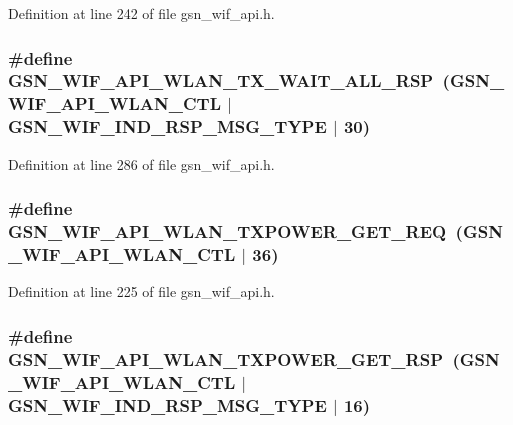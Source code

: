 Definition at line 242 of file gsn\_\-wif\_\-api.h.

\hypertarget{a00606_ae4403ddde31a8f4999ec840615320aa5}{
\subsubsection[{GSN\_\-WIF\_\-API\_\-WLAN\_\-TX\_\-WAIT\_\-ALL\_\-RSP}]{\setlength{\rightskip}{0pt plus 5cm}\#define GSN\_\-WIF\_\-API\_\-WLAN\_\-TX\_\-WAIT\_\-ALL\_\-RSP~(GSN\_\-WIF\_\-API\_\-WLAN\_\-CTL $|$ GSN\_\-WIF\_\-IND\_\-RSP\_\-MSG\_\-TYPE $|$ 30)}}
\label{a00606_ae4403ddde31a8f4999ec840615320aa5}


Definition at line 286 of file gsn\_\-wif\_\-api.h.

\hypertarget{a00606_ac18b706325a23dd410bf82b1ccddf003}{
\subsubsection[{GSN\_\-WIF\_\-API\_\-WLAN\_\-TXPOWER\_\-GET\_\-REQ}]{\setlength{\rightskip}{0pt plus 5cm}\#define GSN\_\-WIF\_\-API\_\-WLAN\_\-TXPOWER\_\-GET\_\-REQ~(GSN\_\-WIF\_\-API\_\-WLAN\_\-CTL $|$ 36)}}
\label{a00606_ac18b706325a23dd410bf82b1ccddf003}


Definition at line 225 of file gsn\_\-wif\_\-api.h.

\hypertarget{a00606_a96cdab55830b9edbe1cc69eaa85dc825}{
\subsubsection[{GSN\_\-WIF\_\-API\_\-WLAN\_\-TXPOWER\_\-GET\_\-RSP}]{\setlength{\rightskip}{0pt plus 5cm}\#define GSN\_\-WIF\_\-API\_\-WLAN\_\-TXPOWER\_\-GET\_\-RSP~(GSN\_\-WIF\_\-API\_\-WLAN\_\-CTL $|$ GSN\_\-WIF\_\-IND\_\-RSP\_\-MSG\_\-TYPE $|$ 16)}}
\label{a00606_a96cdab55830b9edbe1cc69eaa85dc825}


